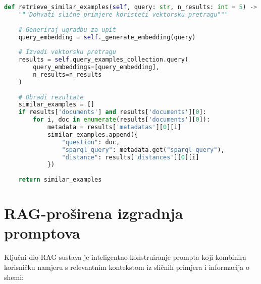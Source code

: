 \begin{lstlisting}[language=Python, caption=Semantička pretraga sličnih primjera]
def retrieve_similar_examples(self, query: str, n_results: int = 5) -> List[Dict[str, Any]]:
    """Dohvati slične primjere koristeći vektorsku pretragu"""
    
    # Generiraj ugradbu za upit
    query_embedding = self._generate_embedding(query)
    
    # Izvedi vektorsku pretragu
    results = self.query_examples_collection.query(
        query_embeddings=[query_embedding],
        n_results=n_results
    )
    
    # Obradi rezultate
    similar_examples = []
    if results['documents'] and results['documents'][0]:
        for i, doc in enumerate(results['documents'][0]):
            metadata = results['metadatas'][0][i]
            similar_examples.append({
                "question": doc,
                "sparql_query": metadata.get("sparql_query"),
                "distance": results['distances'][0][i]
            })
    
    return similar_examples
\end{lstlisting}

\section{RAG-proširena izgradnja promptova}
\label{sec:rag_prompt_building}

Ključni dio RAG sustava je inteligentno konstruiranje prompta koji kombinira korisničku namjeru s relevantnim kontekstom iz sličnih primjera i informacija o shemi:

